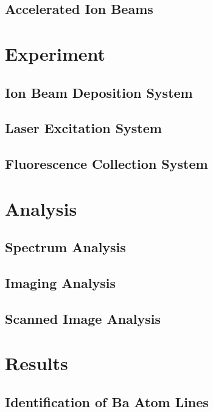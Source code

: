 \documentclass[doctor]{thesis} %
\begin{document}
\section{Accelerated Ion Beams}


\chapter{Experiment}
\label{chap:experiment}

\section{Ion Beam Deposition System}
\section{Laser Excitation System}
\section{Fluorescence Collection System}

\chapter{Analysis}
\label{chap:analysis}

\section{Spectrum Analysis}
\section{Imaging Analysis}
\section{Scanned Image Analysis} 

\chapter{Results}
\label{chap:results}

\section{Identification of Ba Atom Lines}
\end{document}
